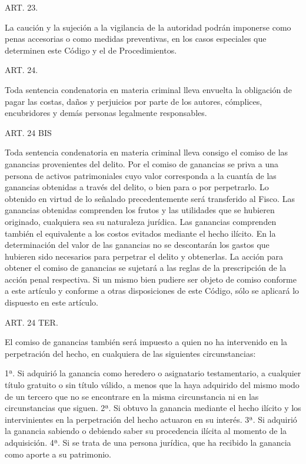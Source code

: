     ART. 23.

    La caución y la sujeción a la vigilancia de la autoridad podrán imponerse como penas accesorias o como medidas preventivas, en los casos especiales que determinen este Código y el de Procedimientos.


    ART. 24.

    Toda sentencia condenatoria en materia criminal lleva envuelta la obligación de pagar las costas, daños y perjuicios por parte de los autores, cómplices, encubridores y demás personas legalmente responsables.

    ART. 24 BIS

    Toda sentencia condenatoria en materia criminal lleva consigo el comiso de las ganancias provenientes del delito. Por el comiso de ganancias se priva a una persona de activos patrimoniales cuyo valor corresponda a la cuantía de las ganancias obtenidas a través del delito, o bien para o por perpetrarlo. Lo obtenido en virtud de lo señalado precedentemente será transferido al Fisco.
    Las ganancias obtenidas comprenden los frutos y las utilidades que se hubieren originado, cualquiera sea su naturaleza jurídica. Las ganancias comprenden también el equivalente a los costos evitados mediante el hecho ilícito.
    En la determinación del valor de las ganancias no se descontarán los gastos que hubieren sido necesarios para perpetrar el delito y obtenerlas.
    La acción para obtener el comiso de ganancias se sujetará a las reglas de la prescripción de la acción penal respectiva.
    Si un mismo bien pudiere ser objeto de comiso conforme a este artículo y conforme a otras disposiciones de este Código, sólo se aplicará lo dispuesto en este artículo.   


    ART. 24 TER.

    El comiso de ganancias también será impuesto a quien no ha intervenido en la perpetración del hecho, en cualquiera de las siguientes circunstancias:

    1ª. Si adquirió la ganancia como heredero o asignatario testamentario, a cualquier título gratuito o sin título válido, a menos que la haya adquirido del mismo modo de un tercero que no se encontrare en la misma circunstancia ni en las circunstancias que siguen.
    2ª. Si obtuvo la ganancia mediante el hecho ilícito y los intervinientes en la perpetración del hecho actuaron en su interés.
    3ª. Si adquirió la ganancia sabiendo o debiendo saber su procedencia ilícita al momento de la adquisición.
    4ª. Si se trata de una persona jurídica, que ha recibido la ganancia como aporte a su patrimonio.
   

